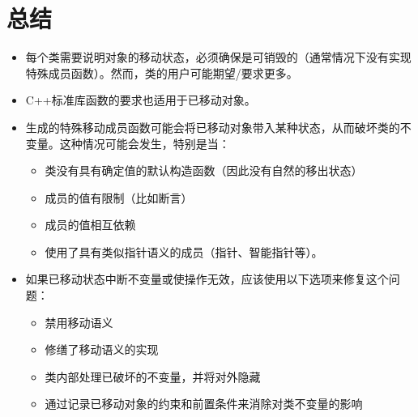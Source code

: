 \section{总结}
\begin{itemize}
	\item 每个类需要说明对象的移动状态，必须确保是可销毁的（通常情况下没有实现特殊成员函数）。然而，类的用户可能期望/要求更多。
	\item C++标准库函数的要求也适用于已移动对象。
	\item 生成的特殊移动成员函数可能会将已移动对象带入某种状态，从而破坏类的不变量。这种情况可能会发生，特别是当：
	\begin{itemize}
		\item 类没有具有确定值的默认构造函数（因此没有自然的移出状态）
		\item 成员的值有限制（比如断言）
		\item 成员的值相互依赖
		\item 使用了具有类似指针语义的成员（指针、智能指针等）。
	\end{itemize}
	\item 如果已移动状态中断不变量或使操作无效，应该使用以下选项来修复这个问题：
	\begin{itemize}
		\item 禁用移动语义
		\item 修缮了移动语义的实现
		\item 类内部处理已破坏的不变量，并将对外隐藏
		\item 通过记录已移动对象的约束和前置条件来消除对类不变量的影响
	\end{itemize}
\end{itemize}


